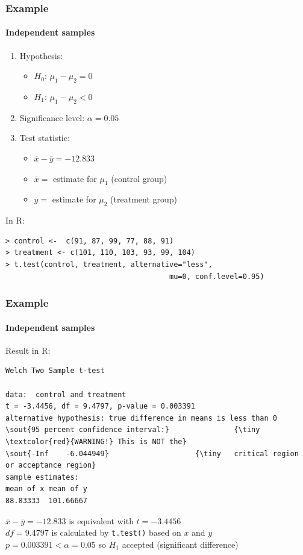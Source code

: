 \documentclass{beamer}
\begin{document}
\begin{frame}[fragile]
  \frametitle{Example}
  \framesubtitle{Independent samples}
\begin{enumerate}
    \item Hypothesis:
    \begin{itemize}
        \item $H_0$: $\mu_1 - \mu_2 = 0$
        \item $H_1$: $\mu_1 - \mu_2 < 0$
    \end{itemize}
    \item Significance level: $\alpha = 0.05$
    \item Test statistic:
    \begin{itemize}
        \item $\overline{x}-\overline{y} = -12.833$
        \item $\overline{x} =$ estimate for $\mu_1$ (control group) 
        \item $\overline{y} =$ estimate for $\mu_2$ (treatment group) 
    \end{itemize}
\end{enumerate}
\vfill
In R:
{\footnotesize
\begin{verbatim}
> control <-  c(91, 87, 99, 77, 88, 91)
> treatment <- c(101, 110, 103, 93, 99, 104)
> t.test(control, treatment, alternative="less",
                                      mu=0, conf.level=0.95)
\end{verbatim}
}
\end{frame}

\begin{frame}[fragile]
  \frametitle{Example}
  \framesubtitle{Independent samples}
Result in R:
{\footnotesize
\begin{Verbatim}[commandchars=\\\{\}]
	Welch Two Sample t-test

data:  control and treatment
t = -3.4456, df = 9.4797, p-value = 0.003391
alternative hypothesis: true difference in means is less than 0
\sout{95 percent confidence interval:}               {\tiny \textcolor{red}{WARNING!} This is NOT the}
\sout{-Inf    -6.044949}                    {\tiny   critical region or acceptance region}
sample estimates:
mean of x mean of y 
88.83333  101.66667   
\end{Verbatim}
}
\vfill
$\overline{x}-\overline{y}=-12.833$ is equivalent with $t=-3.4456$\\
$df=9.4797$ is calculated by \texttt{t.test()} based on $x$ and $y$\\
$p = 0.003391 < \alpha = 0.05$ so $H_1$ accepted (significant difference)
\end{frame}
\end{document}
